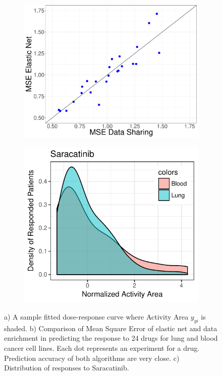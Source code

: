 \begin{figure}[t]
\begin{subfigure}[b]{0.30\textwidth}
		\includegraphics[width=\textwidth]{./img/MSEComparison.pdf}
		\caption{}\label{fig:prediction}
	\end{subfigure}
	\begin{subfigure}[b]{0.29\textwidth}
	\includegraphics[width=\textwidth,]{./img/Saracatinib.pdf}
	\caption{}\label{fig:Saracatinib}
	\end{subfigure}
	\caption{a) A sample fitted dose-response curve where Activity Area $y_{gi}$ is shaded. b) Comparison of Mean Square Error of elastic net and data enrichment in predicting the response to 24 drugs for lung and blood cancer cell lines. Each dot represents an experiment for a drug. Prediction accuracy of both algorithms are very close. c) Distribution of responses to Saracatinib.}
	\label{fig syn2}
	\end{figure}

